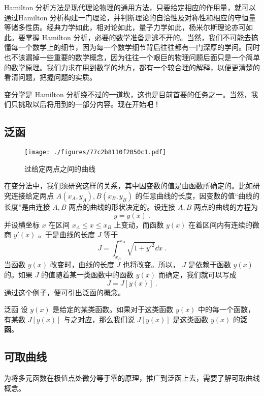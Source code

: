 
Hamilton 分析方法是现代理论物理的通用方法，只要给定相应的作用量，就可以通过Hamilton 分析构建一门理论，并判断理论的自洽性及对称性和相应的守恒量等诸多性质。经典力学如此，相对论如此，量子力学如此，杨米尔斯理论亦可如此。要掌握 Hamilton 分析，必要的数学准备是逃不开的。当然，我们不可能去搞懂每一个数学上的细节，因为每一个数学细节背后往往都有一门深厚的学问。同时也不该漏掉一些重要的数学概念，因为往往一个艰巨的物理问题后面只是一个简单的数学原理。我们力求在用到数学的地方，都有一个较合理的解释，以便更清楚的看清问题，把握问题的实质。

变分学是 Hamilton 分析绕不过的一道坎，这也是目前首要的任务之一。当然，我们只挑取以后将用到的一部分内容。现在开始吧！
\subsection{泛函}
\begin{figure}[ht]
\centering
\texttt{[image: ./figures/77c2b8110f2050c1.pdf]}
\caption{过给定两点之间的曲线} \label{fig_DesCur_1}
\end{figure}
在变分法中，我们须研究这样的关系，其中因变数的值是由函数所确定的。比如研究连接给定两点 $A(x_A,y_A),B(x_B,y_B)$ 的任意曲线的长度，因变数的值“曲线的长度”是由连接 $A,B$ 两点的曲线的形状决定的。设连接 $A,B$ 两点的曲线的方程为
\begin{equation}
y=y(x)~.
\end{equation}
并设横坐标 $x$ 在区间 $x_A\leq x\leq x_B$ 上变动，而函数 $y(x)$ 在着区间内有连续的微商 $y'(x)$ 。于是曲线的长度 $J$ 等于
\begin{equation}
J=\int_{x_A}^{x_B} \sqrt{1+y'^2}\dd x~.
\end{equation}
当函数 $y(x)$ 改变时，曲线的长度 $J$ 也将改变。所以， $J$ 是依赖于函数 $y(x)$ 的。如果 $J$ 的值随着某一类函数中的函数 $y(x)$ 而确定，我们就可以写成
\begin{equation}
J=J[y(x)]~.
\end{equation}
通过这个例子，便可引出泛函的概念。
\begin{definition}{泛函}
设 $y(x)$ 是给定的某类函数。如果对于这类函数 $y(x)$ 中的每一个函数，有某数 $J[y(x)]$ 与之对应，那么我们说 $J[y(x)]$ 是这类函数 $y(x)$ 的\textbf{泛函}。
\end{definition}
\subsection{可取曲线}\label{sub_DesCur_1}
为将多元函数在极值点处微分等于零的原理，推广到泛函上去，需要了解可取曲线概念。

